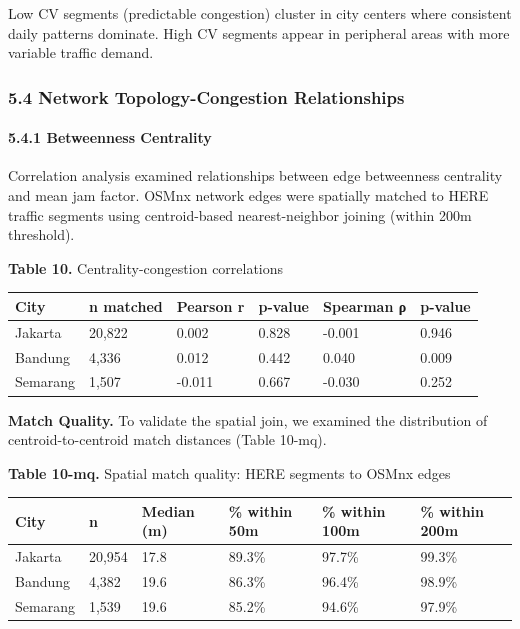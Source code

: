\documentclass[
  12pt,
]{article}
\begin{document}
Low CV segments (predictable congestion) cluster in city centers where consistent daily patterns dominate. High CV segments appear in peripheral areas with more variable traffic demand.

\subsubsection{5.4 Network Topology-Congestion Relationships}\label{network-topology-congestion-relationships}

\paragraph{5.4.1 Betweenness Centrality}\label{betweenness-centrality}

Correlation analysis examined relationships between edge betweenness centrality and mean jam factor. OSMnx network edges were spatially matched to HERE traffic segments using centroid-based nearest-neighbor joining (within 200m threshold).

\textbf{Table 10.} Centrality-congestion correlations

\begin{longtable}[]{@{}llllll@{}}
\toprule\noalign{}
City & n matched & Pearson r & p-value & Spearman ρ & p-value \\
\midrule\noalign{}
\endhead
\bottomrule\noalign{}
\endlastfoot
Jakarta & 20,822 & 0.002 & 0.828 & -0.001 & 0.946 \\
Bandung & 4,336 & 0.012 & 0.442 & 0.040 & 0.009 \\
Semarang & 1,507 & -0.011 & 0.667 & -0.030 & 0.252 \\
\end{longtable}

\textbf{Match Quality.} To validate the spatial join, we examined the distribution of centroid-to-centroid match distances (Table 10-mq).

\textbf{Table 10-mq.} Spatial match quality: HERE segments to OSMnx edges

\begin{longtable}[]{@{}llllll@{}}
\toprule\noalign{}
City & n & Median (m) & \% within 50m & \% within 100m & \% within 200m \\
\midrule\noalign{}
\endhead
\bottomrule\noalign{}
\endlastfoot
Jakarta & 20,954 & 17.8 & 89.3\% & 97.7\% & 99.3\% \\
Bandung & 4,382 & 19.6 & 86.3\% & 96.4\% & 98.9\% \\
Semarang & 1,539 & 19.6 & 85.2\% & 94.6\% & 97.9\% \\
\end{longtable}
\end{document}
